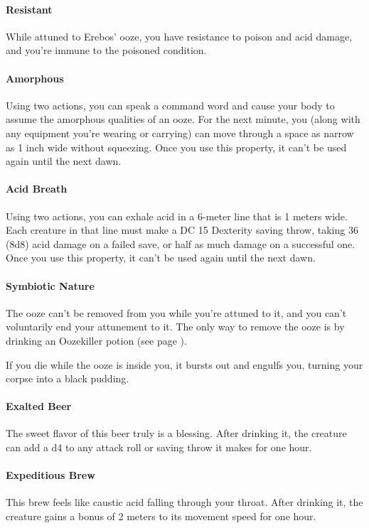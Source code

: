         \paragraph{Resistant} While attuned to Erebos' ooze, you have resistance to poison and acid damage, and you're immune to the poisoned condition.
        \paragraph{Amorphous} Using two actions, you can speak a command word and cause your body to assume the amorphous qualities of an ooze.
        For the next minute, you (along with any equipment you're wearing or carrying) can move through a space as narrow as 1 inch wide without squeezing.
        Once you use this property, it can't be used again until the next dawn.
        \paragraph{Acid Breath} Using two actions, you can exhale acid in a 6-meter line that is 1 meters wide.
        Each creature in that line must make a DC 15 Dexterity saving throw, taking 36 (8d8) acid damage on a failed save, or half as much damage on a successful one.
        Once you use this property, it can't be used again until the next dawn.
        \paragraph{Symbiotic Nature} The ooze can't be removed from you while you're attuned to it, and you can't voluntarily end your attunement to it.
        The only way to remove the ooze is by drinking an Oozekiller potion (see page \pageref{item::oozekiller}).

        If you die while the ooze is inside you, it bursts out and engulfs you, turning your corpse into a black pudding.
    \paragraph{Exalted Beer} %
        The sweet flavor of this beer truly is a blessing.
        After drinking it, the creature can add a d4 to any attack roll or saving throw it makes for one hour.
    \paragraph{Expeditious Brew} %
        This brew feels like caustic acid falling through your throat.
        After drinking it, the creature gains a bonus of 2 meters to its movement speed for one hour.
